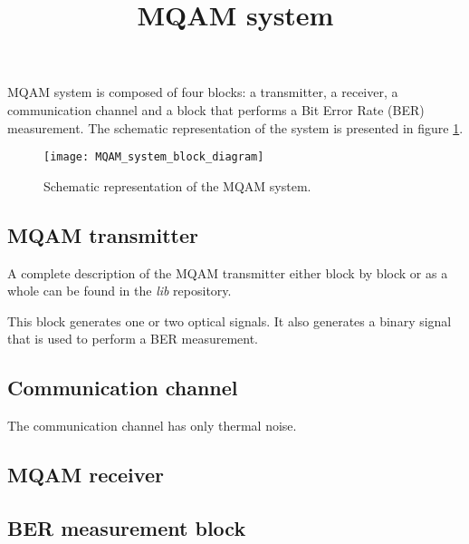 \documentclass[a4paper]{article}
\title{MQAM system}
\begin{document}
	
	\maketitle
	
MQAM system is composed of four blocks: a transmitter, a receiver, a communication channel and a block that performs a Bit Error Rate (BER) measurement. The schematic representation of the system is presented in figure \ref{MQAM_system_block_diagram}.

\begin{figure}
	\centering
	\texttt{[image: MQAM\_system\_block\_diagram]}
	\caption{Schematic representation of the MQAM system.}\label{MQAM_system_block_diagram}
\end{figure}

\subsection*{MQAM transmitter}

A complete description of the MQAM transmitter either block by block or as a whole can be found in the \textit{lib} repository. 

This block generates one or two optical signals. It also generates a binary signal that is used to perform a BER measurement.

\subsection*{Communication channel}

The communication channel has only thermal noise. 

\subsection*{MQAM receiver}

\subsection*{BER measurement block}
\end{document}
